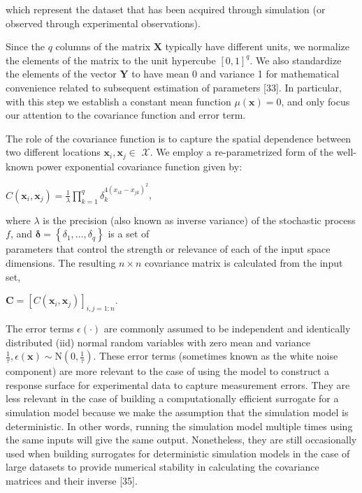 \documentclass[10pt]{article}
\begin{document}
which represent the dataset that has been acquired through simulation (or observed through experimental observations).

Since the $q$ columns of the matrix $\mathbf{X}$ typically have different units, we normalize the elements of the matrix to the unit hypercube $[0,1]^{q}$. We also standardize the elements of the vector $\mathbf{Y}$ to have mean 0 and variance 1 for mathematical convenience related to subsequent estimation of parameters [33]. In particular, with this step we establish a constant mean function $\mu(\mathbf{x})=0$, and only focus our attention to the covariance function and error term.

The role of the covariance function is to capture the spatial dependence between two different locations $\mathbf{x}_{i}, \mathbf{x}_{j} \in$ $\mathcal{X}$. We employ a re-parametrized form of the well-known power exponential covariance function given by:

$C\left(\mathbf{x}_{i}, \mathbf{x}_{j}\right)=\frac{1}{\lambda} \prod_{k=1}^{q} \delta_{k}^{4\left(x_{i k}-x_{j k}\right)^{2}}$,

where $\lambda$ is the precision (also known as inverse variance) of the stochastic process $f$, and $\boldsymbol{\delta}=\left\{\delta_{1}, \ldots, \delta_{q}\right\}$ is a set of\\
parameters that control the strength or relevance of each of the input space dimensions. The resulting $n \times n$ covariance matrix is calculated from the input set,

$\mathbf{C}=\left[C\left(\mathbf{x}_{i}, \mathbf{x}_{j}\right)\right]_{i, j=1: n}$.

The error terms $\epsilon(\cdot)$ are commonly assumed to be independent and identically distributed (iid) normal random variables with zero mean and variance $\frac{1}{\tau}, \epsilon(\mathbf{x}) \sim \mathrm{N}\left(0, \frac{1}{\tau}\right)$. These error terms (sometimes known as the white noise component) are more relevant to the case of using the model to construct a response surface for experimental data to capture measurement errors. They are less relevant in the case of building a computationally efficient surrogate for a simulation model because we make the assumption that the simulation model is deterministic. In other words, running the simulation model multiple times using the same inputs will give the same output. Nonetheless, they are still occasionally used when building surrogates for deterministic simulation models in the case of large datasets to provide numerical stability in calculating the covariance matrices and their inverse [35].
\end{document}
